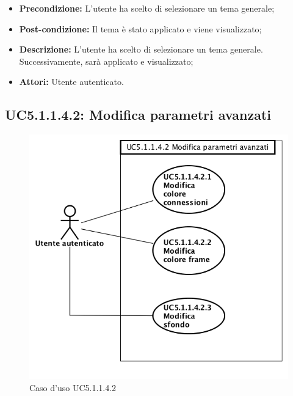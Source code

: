 \begin{itemize}
	\item \textbf{Precondizione:} L'utente ha scelto di selezionare un tema generale;
	\item \textbf{Post-condizione:} Il tema è stato applicato e viene visualizzato;
	\item \textbf{Descrizione:} L'utente ha scelto di selezionare un tema generale. Successivamente, sarà applicato e visualizzato;
	\item \textbf{Attori:} Utente autenticato.
\end{itemize}
\subsection{ UC5.1.1.4.2: Modifica parametri avanzati}

\begin{figure}[h]
	\begin{center}
	\includegraphics[scale=0.4]{diagram/UC5-1-1-4-2.png}
	\caption{Caso d'uso UC5.1.1.4.2}
	\end{center}
\end{figure}
